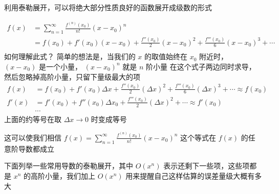 \documentclass[lang=cn,newtx,10pt,scheme=chinese]{elegantbook}
\begin{document}
利用泰勒展开，可以将绝大部分性质良好的函数展开成级数的形式

\begin{equation}
  \begin{aligned}
  f(x)&=\sum_{n=1}^{\infty } \frac{f^{(n)}(x_0)}{n!} (x-x_0)^{n}\\
  &=f(x_0)+f'(x_0)(x-x_0)+\frac{f''(x_0)}{2} (x-x_0)^{2}+\frac{f'''(x_0)}{6}(x-x_0)^{3}+ \cdots \\
  \end{aligned} 
\end{equation}
如何理解此式？
简单的想法是，当我们的 $x$ 的取值始终在 $x_0$ 附近时， $(x-x_0)$ 是一个小量， $(x-x_0)^{n}$ 就是 $n$ 阶小量
在这个式子两边同时求导，然后忽略掉高阶小量，只留下量级最大的项
  \begin{equation}
  \begin{aligned}
  f(x)&=f(x_0)+f'(x_0)\Delta x+\frac{f''(x_0)}{2} (\Delta x)^{2}+\frac{f'''(x_0)}{6}(\Delta x)^{3}+ \cdots \approx f(x_0) \\
  f'(x)&=f'(x_0)+f''(x_0)\Delta x_0+\frac{f'''(x_0)}{2}(\Delta x)^{2}+ \cdots \approx f'(x_0)\\
  &\cdots
  \end{aligned} 
\end{equation}
上面的约等号在取 $\Delta x\to 0$ 时变成等号

这可以使我们相信 $f(x)=\sum_{n=1}^{\infty } \frac{f^{(n)}(x_0)}{n!} (x-x_0)^{n}$ 这个等式在 $f(x)$ 的任意阶导数都成立

下面列举一些常用导数的泰勒展开，其中 $O(x^{n})$ 表示还剩下一些项，这些项都是 $x^{n}$ 的高阶小量，我们加上 $O(x^{n})$ 用来提醒自己这样估算的误差量级大概有多大
\end{document}
